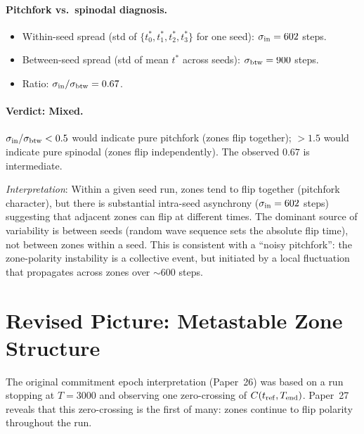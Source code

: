 \documentclass[11pt,a4paper]{article}
\begin{document}
\paragraph{Pitchfork vs.\ spinodal diagnosis.}
\begin{itemize}
  \item Within-seed spread (std of $\{t^*_0, t^*_1, t^*_2, t^*_3\}$ for one
        seed): $\sigma_{\rm in} = 602$ steps.
  \item Between-seed spread (std of mean $t^*$ across seeds):
        $\sigma_{\rm btw} = 900$ steps.
  \item Ratio: $\sigma_{\rm in}/\sigma_{\rm btw} = 0.67$.
\end{itemize}

\paragraph{Verdict: Mixed.}
$\sigma_{\rm in}/\sigma_{\rm btw} < 0.5$ would indicate pure pitchfork
(zones flip together); $> 1.5$ would indicate pure spinodal (zones flip
independently).  The observed $0.67$ is intermediate.

\emph{Interpretation}: Within a given seed run, zones tend to flip together
(pitchfork character), but there is substantial intra-seed asynchrony
($\sigma_{\rm in} = 602$ steps) suggesting that adjacent zones can flip at
different times.  The dominant source of variability is between seeds
(random wave sequence sets the absolute flip time), not between zones within
a seed.  This is consistent with a ``noisy pitchfork'': the zone-polarity
instability is a collective event, but initiated by a local fluctuation that
propagates across zones over $\sim 600$ steps.

\section{Revised Picture: Metastable Zone Structure}

The original commitment epoch interpretation (Paper~26) was based on a run
stopping at $T=3000$ and observing one zero-crossing of $C(t_{\rm ref},
T_{\rm end})$.  Paper~27 reveals that this zero-crossing is the first of many:
zones continue to flip polarity throughout the run.
\end{document}

